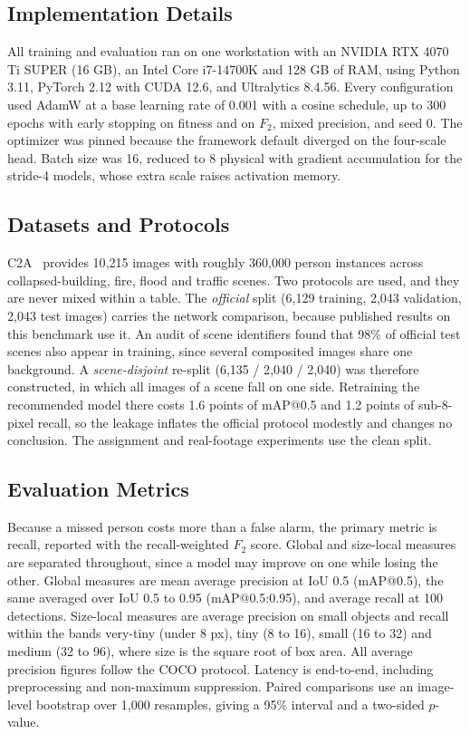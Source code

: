 \documentclass[conference,a4paper]{IEEEtran}
\begin{document}
\subsection{Implementation Details}
All training and evaluation ran on one workstation with an NVIDIA RTX 4070 Ti
SUPER (16 GB), an Intel Core i7-14700K and 128 GB of RAM, using Python 3.11,
PyTorch 2.12 with CUDA 12.6, and Ultralytics 8.4.56. Every configuration used
AdamW at a base learning rate of 0.001 with a cosine schedule, up to 300 epochs
with early stopping on fitness and on $F_2$, mixed precision, and seed 0. The
optimizer was pinned because the framework default diverged on the four-scale
head. Batch size was 16, reduced to 8 physical with gradient accumulation for
the stride-4 models, whose extra scale raises activation memory.

\subsection{Datasets and Protocols}
C2A~\cite{nihal2024c2a} provides 10{,}215 images with roughly 360{,}000 person
instances across collapsed-building, fire, flood and traffic scenes. Two
protocols are used, and they are never mixed within a table. The \emph{official}
split (6{,}129 training, 2{,}043 validation, 2{,}043 test images) carries the
network comparison, because published results on this benchmark use it. An audit
of scene identifiers found that 98\% of official test scenes also appear in
training, since several composited images share one background. A
\emph{scene-disjoint} re-split (6{,}135 / 2{,}040 / 2{,}040) was therefore
constructed, in which all images of a scene fall on one side. Retraining the recommended model there costs
1.6 points of mAP@0.5 and 1.2 points of sub-8-pixel recall, so the leakage inflates
the official protocol modestly and changes no conclusion. The assignment and
real-footage experiments use the clean split.

\subsection{Evaluation Metrics}
Because a missed person costs more than a false alarm, the primary metric is
recall, reported with the recall-weighted $F_2$ score. Global and size-local
measures are separated throughout, since a model may improve on one while losing
the other. Global measures are mean average precision at IoU 0.5 (mAP@0.5), the
same averaged over IoU 0.5 to 0.95 (mAP@0.5:0.95), and average recall at 100
detections. Size-local measures are average precision on small objects and
recall within the bands very-tiny (under 8 px), tiny (8 to 16), small (16 to 32)
and medium (32 to 96), where size is the square root of box area. All average
precision figures follow the COCO protocol. Latency is end-to-end, including
preprocessing and non-maximum suppression. Paired comparisons use an image-level
bootstrap over 1{,}000 resamples, giving a 95\% interval and a two-sided
$p$-value.
\end{document}
